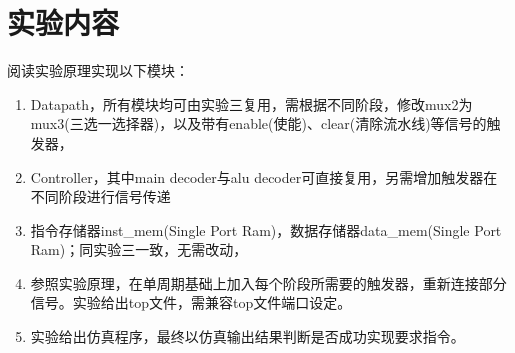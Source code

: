 \section{实验内容}
阅读实验原理实现以下模块：
\begin{enumerate}[(1)]
    \item Datapath，所有模块均可由实验三复用，需根据不同阶段，修改mux2为mux3(三选一选择器)，以及带有enable(使能)、clear(清除流水线)等信号的触发器，
    \item Controller，其中main decoder与alu decoder可直接复用，另需增加触发器在不同阶段进行信号传递
    \item 指令存储器inst\_mem(Single Port Ram)，数据存储器data\_mem(Single Port Ram)；同实验三一致，无需改动，
    \item 参照实验原理，在单周期基础上加入每个阶段所需要的触发器，重新连接部分信号。实验给出top文件，需兼容top文件端口设定。
    \item 实验给出仿真程序，最终以仿真输出结果判断是否成功实现要求指令。
\end{enumerate}